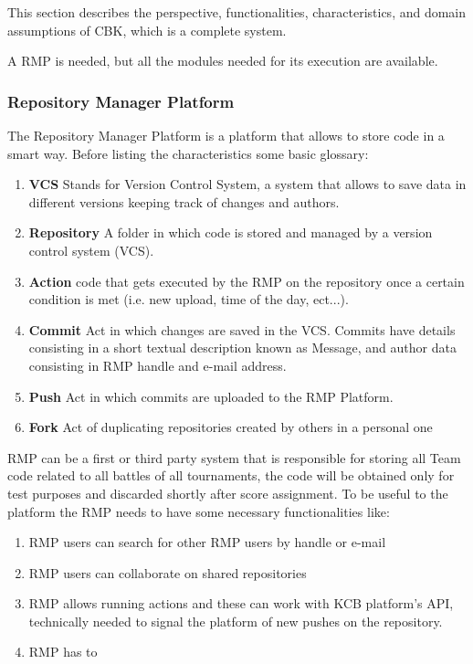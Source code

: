 This section describes the perspective, functionalities, characteristics, and domain assumptions of CBK, which is a complete system.

A RMP is needed, but all the modules needed for its execution are available.
\\

\subsubsection{Repository Manager Platform}
The Repository Manager Platform is a platform that allows to store code in a smart way. Before listing the characteristics some basic glossary:
\begin{enumerate}
    \item \textbf{VCS} Stands for Version Control System, a system that allows to save data in different versions keeping track of changes and authors.
    \item \textbf{Repository} A folder in which code is stored and managed by a version control system (VCS).
    \item \textbf{Action} code that gets executed by the RMP on the repository once a certain condition is met (i.e. new upload, time of the day, ect...).
    \item \textbf{Commit} Act in which changes are saved in the VCS. Commits have details consisting in a short textual description known as Message, and author data consisting in RMP handle and e-mail address.
    \item \textbf{Push} Act in which commits are uploaded to the RMP Platform.
    \item \textbf{Fork} Act of duplicating repositories created by others in a personal one
\end{enumerate}
RMP can be a first or third party system that is responsible for storing all Team code related to all battles of all tournaments, the code will be obtained only for test purposes and discarded shortly after score assignment. 
To be useful to the platform the RMP needs to have some necessary functionalities like:
\begin{enumerate}
    \item RMP users can search for other RMP users by handle or e-mail
    \item RMP users can collaborate on shared repositories
    \item RMP allows running actions and these can work with KCB platform's API, technically needed to signal the platform of new pushes on the repository.
    \item RMP has to 
\end{enumerate}

